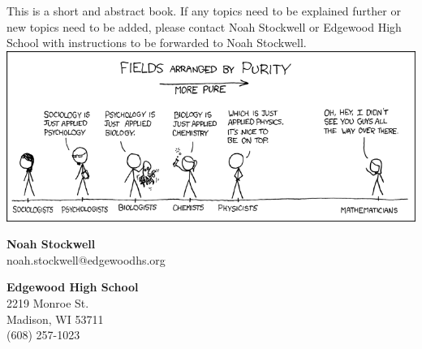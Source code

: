 This is a short and abstract book. If any topics need to be explained further or new topics need to be added, please contact Noah Stockwell or Edgewood High School with instructions to be forwarded to Noah Stockwell.
\vfill
\includegraphics[width=\textwidth]{purity.png}
\vspace{.25in}
\par \textbf{Noah Stockwell}\\
noah.stockwell@edgewoodhs.org\\
\par \textbf{Edgewood High School}\\
2219 Monroe St.\\ Madison, WI 53711\\ (608) 257-1023